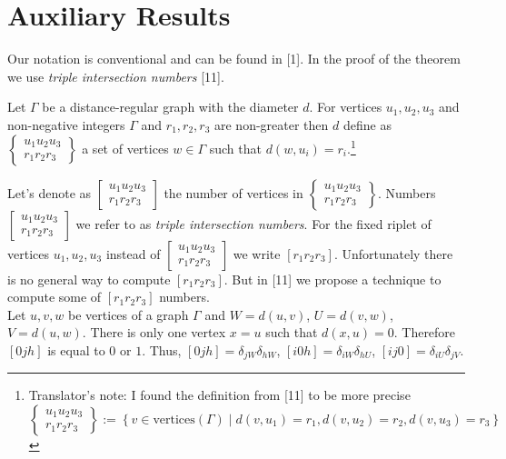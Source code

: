 \documentclass{article}
\theoremstyle{definition}
\theoremstyle{definition}
\theoremstyle{remark}
\begin{document}
\section{Auxiliary Results}

Our notation is conventional and can be found in [1]. In the proof of the theorem we use {\it triple intersection numbers} [11].

Let $\Gamma$ be a distance-regular graph with the diameter $d$. For vertices $u_1, u_2, u_3$ and non-negative integers $\Gamma$ and $r_1, r_2, r_3$ are non-greater then $d$ define as
$ \begin{Bmatrix}
    u_1 u_2 u_3 \\
    r_1 r_2 r_3
\end{Bmatrix}$ a set of vertices $w \in \Gamma$ such that $d(w, u_i) = r_i$.\footnote{Translator's note: I found the definition from [11] to be more precise
\[
\begin{Bmatrix}
    u_1 u_2 u_3 \\
    r_1 r_2 r_3
\end{Bmatrix} := \left\{ v \in \text{vertices}(\Gamma) \mid d(v, u_1) = r_1, d(v, u_2) = r_2, d(v, u_3) = r_3 \right\}
\]

}

Let's denote as
$\begin{bmatrix}
    u_1 u_2 u_3 \\
    r_1 r_2 r_3
\end{bmatrix}$ the number of vertices in
$\begin{Bmatrix}
    u_1 u_2 u_3 \\
    r_1 r_2 r_3
\end{Bmatrix}$. Numbers
$\begin{bmatrix}
    u_1 u_2 u_3 \\
    r_1 r_2 r_3
\end{bmatrix}$
we refer to as {\it triple intersection numbers}. For the fixed riplet of vertices $u_1,u_2,u_3$ instead of
$\begin{bmatrix}
    u_1 u_2 u_3 \\
    r_1 r_2 r_3
\end{bmatrix}$ we write
$[r_1 r_2 r_3]$.
Unfortunately there is no general way to compute $[r_1 r_2 r_3]$. But in [11] we propose a technique to compute some of $[r_1 r_2 r_3]$ numbers.
\\

Let $u,v,w$ be vertices of a graph $\Gamma$ and $W = d(u,v)$, $U = d(v,w)$, $V = d(u,w)$. There is only one vertex $x = u$ such that $d(x,u) = 0$. Therefore $[0jh]$ is equal to $0$ or $1$. Thus, $[0jh] = \delta_{jW}\delta_{hW}$, $[i0h] = \delta_{iW}\delta_{hU}$, $[ij0] = \delta_{iU}\delta_{jV}$.
\end{document}
